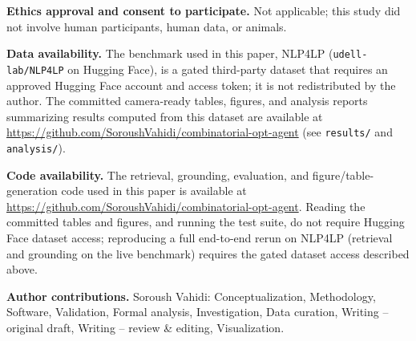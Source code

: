 \documentclass[pdflatex,sn-basic,Numbered]{sn-jnl}
\begin{document}
\noindent\textbf{Ethics approval and consent to participate.} Not applicable; this study did not involve human participants, human data, or animals.

\noindent\textbf{Data availability.} The benchmark used in this paper, NLP4LP (\texttt{udell-lab/NLP4LP} on Hugging Face), is a gated third-party dataset that requires an approved Hugging Face account and access token; it is not redistributed by the author. The committed camera-ready tables, figures, and analysis reports summarizing results computed from this dataset are available at \url{https://github.com/SoroushVahidi/combinatorial-opt-agent} (see \texttt{results/} and \texttt{analysis/}).

\noindent\textbf{Code availability.} The retrieval, grounding, evaluation, and figure/table-generation code used in this paper is available at \url{https://github.com/SoroushVahidi/combinatorial-opt-agent}. Reading the committed tables and figures, and running the test suite, do not require Hugging Face dataset access; reproducing a full end-to-end rerun on NLP4LP (retrieval and grounding on the live benchmark) requires the gated dataset access described above.

\noindent\textbf{Author contributions.} Soroush Vahidi: Conceptualization, Methodology, Software, Validation, Formal analysis, Investigation, Data curation, Writing -- original draft, Writing -- review \& editing, Visualization.


\end{document}
